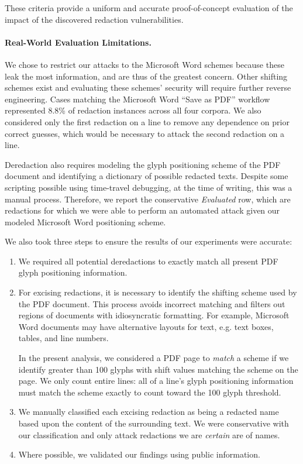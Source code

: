 These criteria provide a uniform and accurate proof-of-concept evaluation of the impact of the discovered redaction vulnerabilities.

\paragraph{Real-World Evaluation Limitations.}
We chose to restrict our attacks to the Microsoft Word schemes because these leak the most information, and are thus of the greatest concern.
Other shifting schemes exist and evaluating these schemes' security will require further reverse engineering.
Cases matching the Microsoft Word ``Save as PDF'' workflow represented 8.8\% of redaction instances across all four corpora.
We also considered only the first redaction on a line to remove any dependence on prior correct guesses, which would be necessary to attack the second redaction on a line.

Deredaction also requires modeling the glyph positioning scheme of the PDF document and identifying a dictionary of possible redacted texts.
Despite some scripting possible using time-travel debugging, at the time of writing, this was a manual process.
Therefore, we report the conservative \emph{Evaluated} row, which are redactions for which we were able to perform an automated attack given our modeled Microsoft Word positioning scheme.

We also took three steps to ensure the results of our experiments were accurate:
\begin{enumerate}
    \item We required all potential deredactions to exactly match all present PDF glyph positioning information.
    \item For excising redactions, it is necessary to identify the shifting scheme used by the PDF document.
This process avoids incorrect matching and filters out regions of documents with idiosyncratic formatting.
For example, Microsoft Word documents may have alternative layouts for text, e.g. text boxes, tables, and line numbers. 

In the present analysis, we considered a PDF page to \emph{match} a scheme if we identify greater than 100 glyphs with shift values matching the scheme on the page.
We only count entire lines: all of a line's glyph positioning information must match the scheme exactly to count toward the 100 glyph threshold.
\item We manually classified each excising redaction as being a redacted name based upon the content of the surrounding text.
We were conservative with our classification and only attack redactions we are \emph{certain} are of names.
\item Where possible, we validated our findings using public information.
\end{enumerate}

